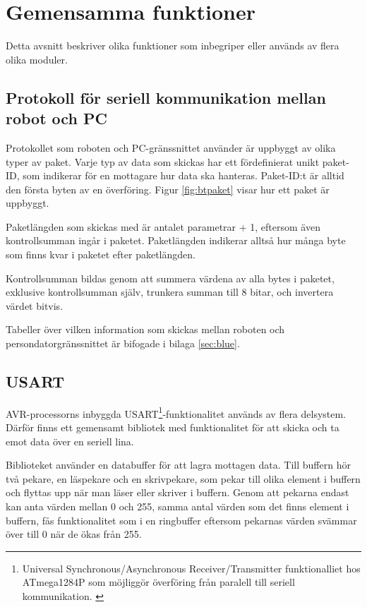 \section{Gemensamma funktioner}
Detta avsnitt beskriver olika funktioner som inbegriper eller används av flera olika moduler. 

\subsection{Protokoll för seriell kommunikation mellan robot och PC}
\label{sec:bt-protokoll}
Protokollet som roboten och PC-gränssnittet använder är uppbyggt av olika typer av paket. Varje typ av data som skickas har ett fördefinierat unikt paket-ID, som indikerar för en mottagare hur data ska hanteras. Paket-ID:t är alltid den första byten av en överföring. Figur \ref{fig:btpaket} visar hur ett paket är uppbyggt.


Paketlängden som skickas med är antalet parametrar + 1, eftersom även kontrollsumman ingår i paketet. Paketlängden indikerar alltså hur många byte som finns kvar i paketet efter paketlängden.

Kontrollsumman bildas genom att summera värdena av alla bytes i paketet, exklusive kontrollsumman själv, trunkera summan till 8 bitar, och invertera värdet bitvis.

Tabeller över vilken information som skickas mellan roboten och persondatorgränssnittet är bifogade i bilaga \ref{sec:blue}.

\subsection{USART}
\label{sec:usart}
AVR-processorns inbyggda USART\footnote{Universal Synchronous/Asynchronous Receiver/Transmitter funktionalliet hos ATmega1284P som möjliggör överföring från paralell till seriell kommunikation. \cite{atmega1284}}-funktionalitet används av flera delsystem. Därför finns ett gemensamt bibliotek med funktionalitet för att skicka och ta emot data över en seriell lina.

Biblioteket använder en databuffer för att lagra mottagen data. Till buffern hör två pekare, en läspekare och en skrivpekare, som pekar till olika element i buffern och flyttas upp när man läser eller skriver i buffern. Genom att pekarna endast kan anta värden mellan 0 och 255, samma antal värden som det finns element i buffern, fås funktionalitet som i en ringbuffer eftersom pekarnas värden svämmar över till 0 när de ökas från 255.

